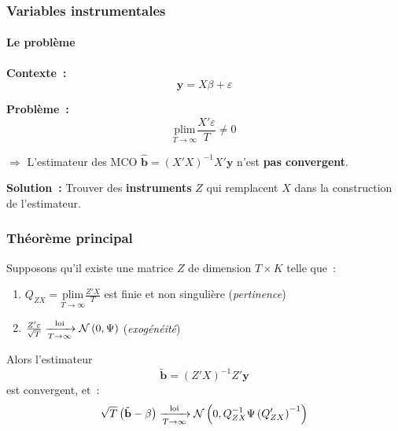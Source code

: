 \documentclass[10pt]{beamer}
\begin{document}
\begin{frame}
  \frametitle{Variables instrumentales}
  \framesubtitle{Le problème}

  \textbf{Contexte~:}
  \[ \mathbf y = X\beta + \varepsilon \]

  \textbf{Problème~:}
  \[ \underset{T\rightarrow\infty}{\text{plim}} \frac{X'\varepsilon}{T} \neq 0 \]

  $\Rightarrow$ L'estimateur des MCO
  $\hat{\mathbf b} = (X'X)^{-1}X'\mathbf y$ n'est \textbf{pas convergent}.

  \bigskip

  \textbf{Solution~:} Trouver des \textbf{instruments} $Z$ qui remplacent $X$
  dans la construction de l'estimateur.

  \bigskip


\end{frame}


\begin{frame}
  \frametitle{Théorème principal}

  \begin{theorem}\label{thm:vi}
    Supposons qu'il existe une matrice $Z$ de dimension $T\times K$ telle que~:
    \begin{enumerate}
    \item $Q_{ZX} = \underset{T\rightarrow\infty}{\text{plim}} \frac{Z'X}{T}$
      est finie et non singulière \hfill (\emph{pertinence})
    \item $\frac{Z'\varepsilon}{\sqrt{T}} \xrightarrow[T\rightarrow\infty]{\text{loi}} \mathcal N\left(0,\Psi\right)$ \hfill (\emph{exogénéité})
    \end{enumerate}
    Alors l'estimateur
    \[ \tilde{\mathbf b} = (Z'X)^{-1}Z'\mathbf y \]
    est convergent, et~:
    \[ \sqrt{T}\left(\tilde{\mathbf b} - \beta\right) \xrightarrow[T\rightarrow\infty]{\text{loi}} \mathcal N\left(0,Q_{ZX}^{-1}\Psi\left(Q_{ZX}'\right)^{-1}\right) \]
  \end{theorem}

  \bigskip


\end{frame}
\end{document}
